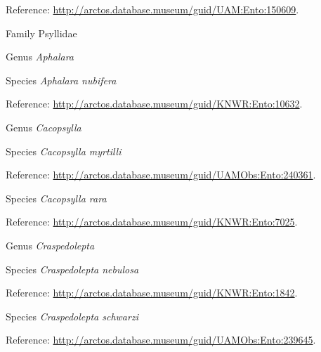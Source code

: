 \documentclass[9pt, article]{memoir}
\begin{document}
\begin{multicols}{2}
\vspace{6pt}Reference: 
\url{http://arctos.database.museum/guid/UAM:Ento:150609}.

\vspace{6pt}\noindent\hspace{24pt}Family Psyllidae


\vspace{6pt}\noindent\hspace{30pt}Genus \textit{Aphalara}


\vspace{6pt}\noindent\hspace{36pt}Species \textit{Aphalara nubifera}


\vspace{6pt}Reference: 
\url{http://arctos.database.museum/guid/KNWR:Ento:10632}.

\vspace{6pt}\noindent\hspace{30pt}Genus \textit{Cacopsylla}


\vspace{6pt}\noindent\hspace{36pt}Species \textit{Cacopsylla myrtilli}


\vspace{6pt}Reference: 
\url{http://arctos.database.museum/guid/UAMObs:Ento:240361}.

\vspace{6pt}\noindent\hspace{36pt}Species \textit{Cacopsylla rara}


\vspace{6pt}Reference: 
\url{http://arctos.database.museum/guid/KNWR:Ento:7025}.

\vspace{6pt}\noindent\hspace{30pt}Genus \textit{Craspedolepta}


\vspace{6pt}\noindent\hspace{36pt}Species \textit{Craspedolepta nebulosa}


\vspace{6pt}Reference: 
\url{http://arctos.database.museum/guid/KNWR:Ento:1842}.

\vspace{6pt}\noindent\hspace{36pt}Species \textit{Craspedolepta schwarzi}


\vspace{6pt}Reference: 
\url{http://arctos.database.museum/guid/UAMObs:Ento:239645}.


\end{multicols}
\end{document}
